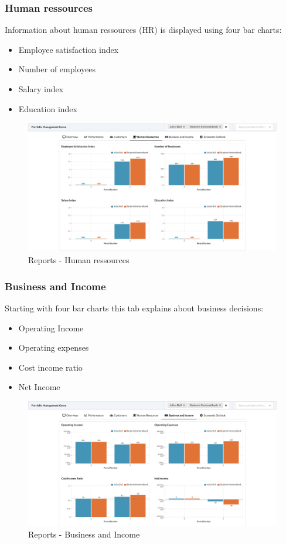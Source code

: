 \subsubsection{Human ressources}
Information about human ressources (HR) is displayed using four bar charts:
\begin{itemize}
  \setlength\itemsep{0.01em}
  \item Employee satisfaction index
  \item Number of employees
  \item Salary index
  \item Education index
\end{itemize}
\begin{figure}[h!]
  \centering
  \includegraphics[scale=0.2]{img/application-overview/reports/04_hr.png}
  \caption{Reports - Human ressources}
\end{figure}

\subsubsection{Business and Income}
Starting with four bar charts this tab explains about business decisions:
\begin{itemize}
  \setlength\itemsep{0.01em}
  \item Operating Income
  \item Operating expenses
  \item Cost income ratio
  \item Net Income
\end{itemize}
\begin{figure}[h!]
  \centering
  \includegraphics[scale=0.2]{img/application-overview/reports/05_business_income.png}
  \caption{Reports - Business and Income}
\end{figure}

